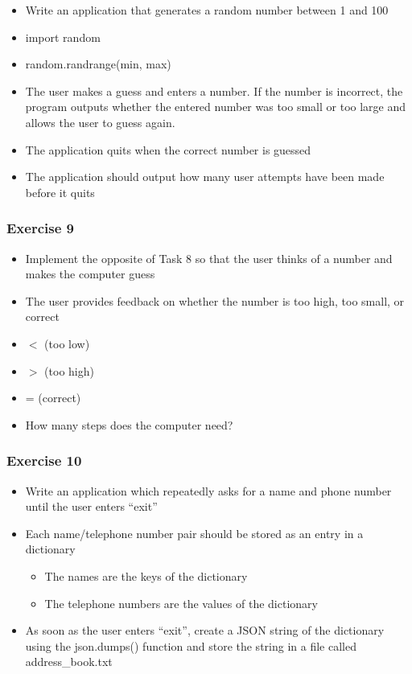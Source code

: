 \documentclass[10pt, a4paper]{beamer} %
\begin{document}
{\begin{frame}[c, fragile]
	\begin{itemize}
		\item  Write an application that generates a random number between 1
		      and 100
		\item  import random
		\item  random.randrange(min, max)
		\item  The user makes a guess and enters a number. If the number is incorrect, the program outputs whether the entered number was too small or too large and allows the user to guess again.
		\item  The application quits when the correct number is guessed
		\item  The application should output how many user attempts have been
		      made before it quits
	\end{itemize}

\end{frame}

\begin{frame}[c, fragile]\frametitle{Exercise 9}

	\begin{itemize}
		\item Implement the opposite of Task 8 so that the user thinks of a number and makes the computer guess
		\item The user provides feedback on whether the number is too high, too small, or correct
		\item $<$ (too low)
		\item $>$ (too high)
		\item = (correct)
		\item How many steps does the computer need?
	\end{itemize}
\end{frame}


\begin{frame}\frametitle{Exercise 10}

	\begin{itemize}
		\item Write an application which repeatedly asks for a name and phone
		      number until the user enters ``exit''
		\item Each name/telephone number pair should be stored as an entry in a dictionary
		      \begin{itemize}
			      \item The names are the keys of the dictionary
			      \item The telephone numbers are the values of the dictionary
		      \end{itemize}
		\item As soon as the user enters ``exit'', create a JSON string of the dictionary using the json.dumps() function and store the string in a file called address\_book.txt
	\end{itemize}


\end{frame}}
\end{document}
